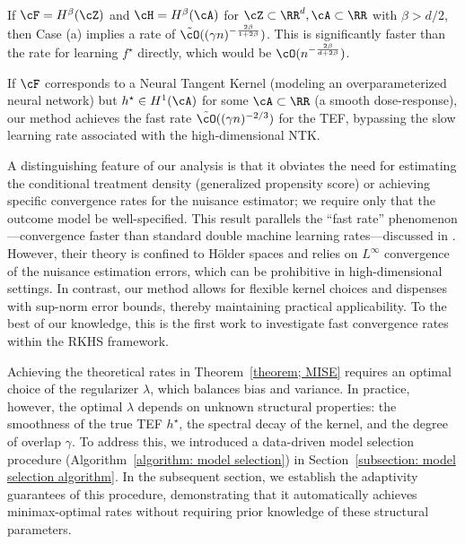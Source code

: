 \documentclass[english,11pt]{article}
\begin{document}
\begin{example}
    If $\cF = H^\beta(\cZ)$ and $\cH =  H^\beta(\cA)$ for \(\cZ \subset \RR^d, \cA \subset \RR\) with $\beta > d/2$, then Case (a) implies a rate of $\tilde{\cO}((\gamma n)^{-\frac{2\beta}{1+2\beta}})$. This is significantly faster than the rate for learning $f^\star$ directly, which would be $\cO(n^{-\frac{2\beta}{d+2\beta}})$.
\end{example}

\begin{example}
    If $\cF$ corresponds to a Neural Tangent Kernel (modeling an overparameterized neural network) but $h^\star \in H^1(\cA)$ for some $\cA \subset \RR$ (a smooth dose-response), our method achieves the fast rate $\tilde{\cO}((\gamma n)^{-2/3})$ for the TEF, bypassing the slow learning rate associated with the high-dimensional NTK.
\end{example}

A distinguishing feature of our analysis is that it obviates the need for estimating the conditional treatment density (generalized propensity score) or achieving specific convergence rates for the nuisance estimator; we require only that the outcome model be well-specified.
This result parallels the ``fast rate'' phenomenon---convergence faster than standard double machine learning rates---discussed in \citet{bonvini2022fast}.
However, their theory is confined to Hölder spaces and relies on $L^\infty$ convergence of the nuisance estimation errors, which can be prohibitive in high-dimensional settings.
In contrast, our method allows for flexible kernel choices and dispenses with sup-norm error bounds, thereby maintaining practical applicability.
To the best of our knowledge, this is the first work to investigate fast convergence rates within the RKHS framework.

Achieving the theoretical rates in Theorem~\ref{theorem; MISE} requires an optimal choice of the regularizer $\lambda$, which balances bias and variance.
In practice, however, the optimal $\lambda$ depends on unknown structural properties: the smoothness of the true TEF $h^\star$, the spectral decay of the kernel, and the degree of overlap $\gamma$.
To address this, we introduced a data-driven model selection procedure (Algorithm~\ref{algorithm: model selection}) in Section~\ref{subsection: model selection algorithm}.
In the subsequent section, we establish the adaptivity guarantees of this procedure, demonstrating that it automatically achieves minimax-optimal rates without requiring prior knowledge of these structural parameters.
\end{document}
